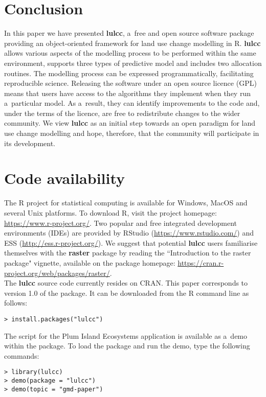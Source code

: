\documentclass{icldt}\usepackage[]{graphicx}\usepackage[]{color}
\begin{document}
\section{Conclusion}
In this paper we have presented \textbf{lulcc}, a~free and open source software package providing an object-oriented framework for land use change modelling in R. \textbf{lulcc} allows various aspects of the modelling process to be performed within the same environment, supports three types of predictive model and includes two allocation routines. The modelling process can be expressed programmatically, facilitating reproducible science. Releasing the software under an open source licence (GPL) means that users have access to the algorithms they implement when they run a~particular model. As a~result, they can identify improvements to the code and, under the terms of the licence, are free to redistribute changes to the wider community. We view \textbf{lulcc} as an initial step towards an open paradigm for land use change modelling and hope, therefore, that the community will participate in its development. \\

\section*{Code availability}
The R project for statistical computing is available for Windows, MacOS and several Unix platforms. To download R, visit the project homepage: \url{https://www.r-project.org/}. Two popular and free integrated development environments (IDEs) are provided by RStudio (\url{https://www.rstudio.com/}) and ESS (\url{http://ess.r-project.org/}). We suggest that potential \textbf{lulcc} users familiarise themselves with the \textbf{raster} package by reading the ``Introduction to the raster package" vignette, available on the package homepage: \url{https://cran.r-project.org/web/packages/raster/}. \\

The \textbf{lulcc} source code currently resides on CRAN. This paper corresponds to version 1.0 of the package. It can be downloaded from the R command line as follows:
\begin{verbatim}
> install.packages("lulcc")
\end{verbatim}
\noindent The script for the Plum Island Ecosystems application is available as a~demo within the package. To load the package and run the demo, type the following commands:
\begin{verbatim}
> library(lulcc)
> demo(package = "lulcc")
> demo(topic = "gmd-paper")
\end{verbatim}
\end{document}
